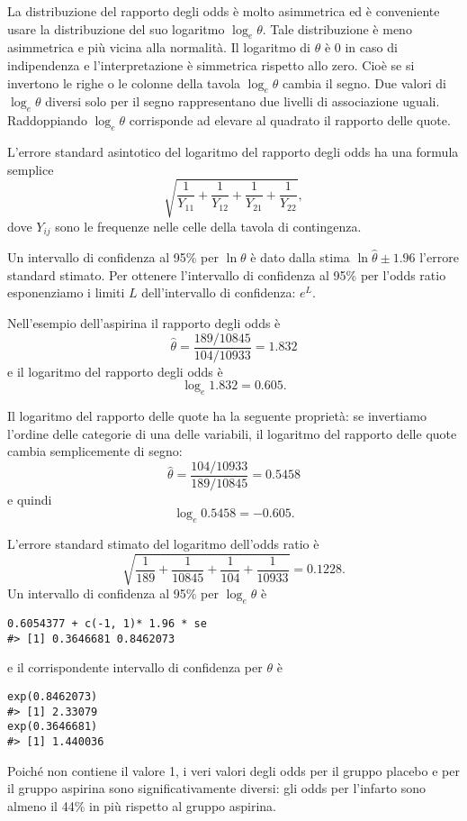 La distribuzione del rapporto degli odds è molto asimmetrica ed è conveniente usare la distribuzione del suo logaritmo $\log_e \theta$. 
Tale distribuzione è meno asimmetrica e più vicina alla normalità.
Il logaritmo di $\theta$ è 0 in caso di indipendenza e l'interpretazione è simmetrica rispetto allo zero. 
Cioè se si invertono le righe o le colonne della tavola $\log_e \theta$ cambia il segno.
Due valori di $\log_e \theta$ diversi solo per il segno rappresentano due livelli di associazione uguali. 
Raddoppiando $\log_e \theta$ corrisponde ad elevare al quadrato il rapporto delle quote.

L'errore standard asintotico del logaritmo del rapporto degli odds ha una formula semplice
\[
\sqrt{\frac{1}{Y_{11}} + \frac{1}{Y_{12}} + \frac{1}{Y_{21}} +
\frac{1}{Y_{22}}},
\]
dove $Y_{ij}$ sono le frequenze nelle celle della tavola di
contingenza.

Un intervallo di confidenza al 95\% per $\ln \theta$ è dato dalla stima $\ln \hat{\theta} \pm 1.96$ l'errore standard stimato.
Per ottenere l'intervallo di confidenza al 95\% per l'odds ratio esponenziamo i limiti $L$ dell'intervallo di confidenza:
$e^L$.

\begin{exmp}
Nell'esempio dell'aspirina il rapporto degli odds è
\[
\hat{\theta} = \frac{189/10845}{104/10933}= 1.832
\]
e il logaritmo del rapporto degli odds è
\[
\log_e 1.832 = 0.605.
\]

Il logaritmo del rapporto delle quote ha la seguente proprietà: se invertiamo l'ordine delle categorie di una delle variabili, il logaritmo del rapporto delle quote cambia semplicemente di segno:
\[
\hat{\theta} = \frac{104/10933}{189/10845}= 0.5458
\]
e quindi
\[
\log_e 0.5458 = -0.605.
\]

L'errore standard stimato del logaritmo dell'odds ratio è
\[
\sqrt{\frac{1}{189} + \frac{1}{10845} + \frac{1}{104} + \frac{1}{10933}} = 0.1228.
\]
Un intervallo di confidenza al 95\% per $\log_e \theta$ è
\begin{lstlisting}
0.6054377 + c(-1, 1)* 1.96 * se
#> [1] 0.3646681 0.8462073
\end{lstlisting}
e il corrispondente intervallo di confidenza per $\theta$ è
\begin{lstlisting}
exp(0.8462073)
#> [1] 2.33079
exp(0.3646681)
#> [1] 1.440036
\end{lstlisting}
Poiché non contiene il valore 1, i veri valori degli odds per il gruppo placebo e per il gruppo aspirina sono significativamente diversi: gli odds per l'infarto sono almeno il 44\% in più rispetto al gruppo aspirina.

\end{exmp}


